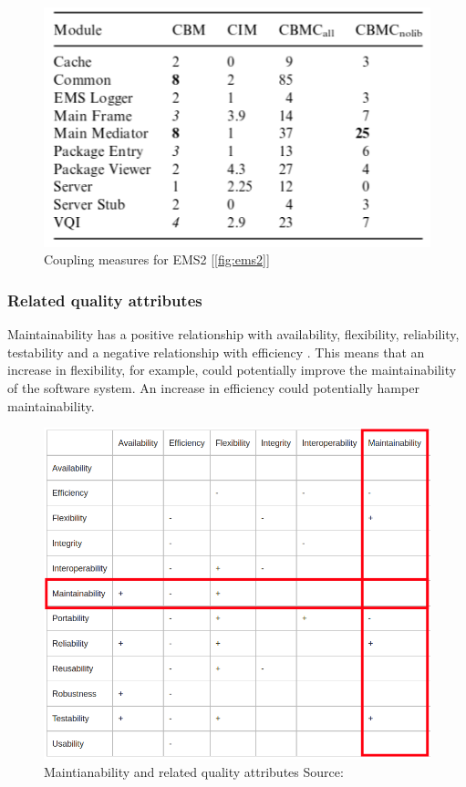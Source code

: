 \documentclass[15pt]{article}
\begin{document}
\begin{figure}
	\includegraphics[scale=0.7]{ems2Table.png} 
	\caption{Coupling measures for EMS2 [\ref{fig:ems2}] \cite{lindvall_empirically-based_2003}}
	\label{fig:ems2Table}
\end{figure}

\subsubsection{Related quality attributes}
Maintainability has a positive relationship with availability, flexibility, reliability, testability and a negative relationship with efficiency \cite{karl_software_2003}. This means that an increase in flexibility, for example, could potentially improve the maintainability of the software system. An increase in efficiency could potentially hamper maintainability.\\


\begin{figure}
	\includegraphics[scale=0.3]{qualityAttributeRelation.png} 
	\caption{Maintianability and related quality attributes Source:\cite{morgan_implementing_2007}}
	\label{fig:qualityAttrs}
\end{figure}
\end{document}
